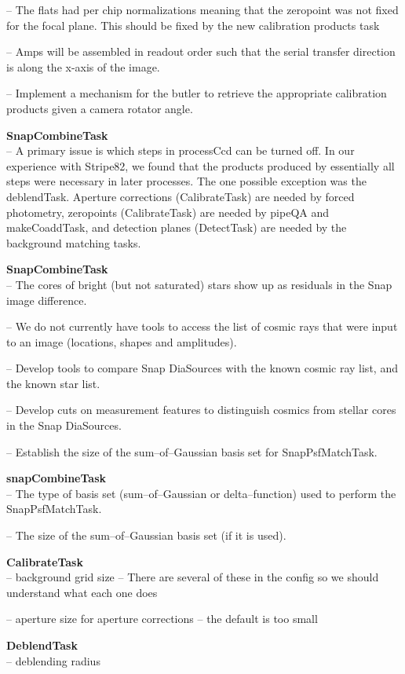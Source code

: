 \documentclass[prd, nofootinbib, floatfix, 11pt,tightenlines,times]{article}
\begin{document}
-- The flats had per chip normalizations meaning that the zeropoint was not fixed for the focal plane.  This should be
fixed by the new calibration products task

-- Amps will be assembled in readout order such that the serial transfer direction is along the x-axis of the image.

-- Implement a mechanism for the butler to retrieve the appropriate calibration products given a camera rotator angle.

{\bf SnapCombineTask}\\
-- A primary issue is which steps in processCcd can be turned off.  In our experience with Stripe82, we found that the products produced by
essentially all steps were necessary in later processes.  The one possible exception was the deblendTask.  Aperture corrections (CalibrateTask) 
are needed by forced photometry, zeropoints (CalibrateTask)
are needed by pipeQA and makeCoaddTask, and detection planes (DetectTask) are needed by the background matching tasks.


{\bf SnapCombineTask}\\
-- The cores of bright (but not saturated) stars show up as residuals
in the Snap image difference.

-- We do not currently have tools to access the list of cosmic rays
that were input to an image (locations, shapes and amplitudes).

-- Develop tools to compare Snap DiaSources with the known cosmic ray
list, and the known star list.

-- Develop cuts on measurement features to distinguish cosmics from
stellar cores in the Snap DiaSources.

-- Establish the size of the sum--of--Gaussian basis set for SnapPsfMatchTask.



{\bf snapCombineTask}\\
-- The type of basis set (sum--of--Gaussian or delta--function) used
to perform the SnapPsfMatchTask.

-- The size of the sum--of--Gaussian basis set (if it is used).

{\bf CalibrateTask}\\
-- background grid size -- There are several of these in the config
  so we should understand what each one does

-- aperture size for aperture corrections -- the default is too small

{\bf DeblendTask}\\
-- deblending radius
\end{document}
